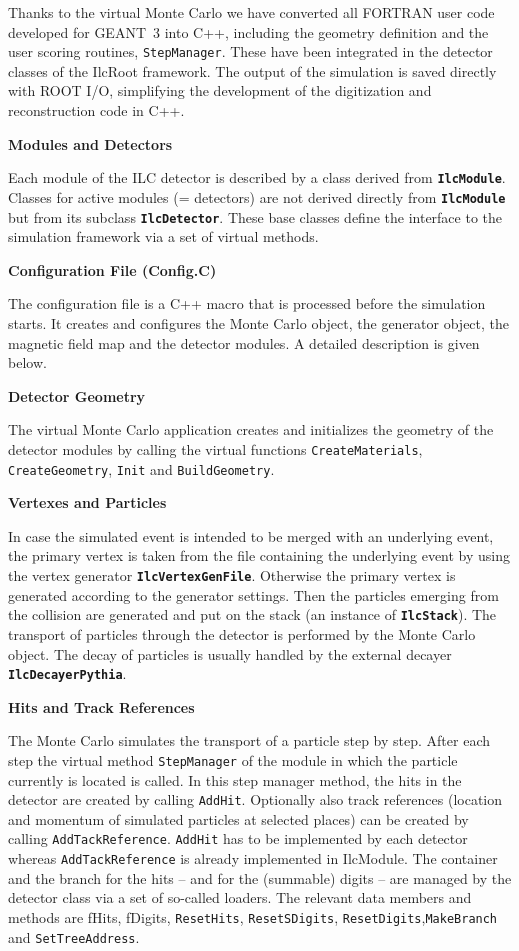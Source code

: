 \documentclass[12pt,a4paper,twoside]{article}
\newcommand{\class}[1]{\texttt{\textbf{#1}}\xspace}
\newcommand{\method}[1]{\texttt{#1}\xspace}
\begin{document}
Thanks to the virtual Monte Carlo we have converted all FORTRAN user
code developed for GEANT~3 into C++, including the geometry definition
and the user scoring routines, \texttt{StepManager}. These have been
integrated in the detector classes of the IlcRoot framework. The
output of the simulation is saved directly with ROOT I/O, simplifying
the development of the digitization and reconstruction code in C++.

\noindent
\textbf{Modules and Detectors}

Each module of the ILC detector is described by a class derived from
\class{IlcModule}. Classes for active modules (= detectors) are not
derived directly from \class{IlcModule} but from its subclass
\class{IlcDetector}. These base classes define the interface to the
simulation framework via a set of virtual methods.

\noindent
\textbf{Configuration File (Config.C)}

The configuration file is a C++ macro that is processed before the
simulation starts. It creates and configures the Monte Carlo object,
the generator object, the magnetic field map and the detector modules.
A detailed description is given below.

\noindent
\textbf{Detector Geometry}

The virtual Monte Carlo application creates and initializes the
geometry of the detector modules by calling the virtual functions
\method{CreateMaterials}, \method{CreateGeometry}, \method{Init} and
\method{BuildGeometry}.

\noindent
\textbf{Vertexes and Particles}

In case the simulated event is intended to be merged with an
underlying event, the primary vertex is taken from the file containing
the underlying event by using the vertex generator
\class{IlcVertexGenFile}. Otherwise the primary vertex is generated
according to the generator settings. Then the particles emerging from
the collision are generated and put on the stack (an instance of
\class{IlcStack}). The transport of particles through the detector is
performed by the Monte Carlo object. The decay of particles is usually
handled by the external decayer \class{IlcDecayerPythia}.

\noindent
\textbf{Hits and Track References}

The Monte Carlo simulates the transport of a particle step by step.
After each step the virtual method \method{StepManager} of the module
in which the particle currently is located is called. In this step
manager method, the hits in the detector are created by calling
\method{AddHit}. Optionally also track references (location and
momentum of simulated particles at selected places) can be created by
calling \method{AddTackReference}. \method{AddHit} has to be
implemented by each detector whereas \method{AddTackReference} is
already implemented in IlcModule. The container and the branch for the
hits -- and for the (summable) digits -- are managed by the detector
class via a set of so-called loaders. The relevant data members and
methods are fHits, fDigits, \method{ResetHits}, \method{ResetSDigits},
\method{ResetDigits},\method{MakeBranch} and \method{SetTreeAddress}.
\end{document}

